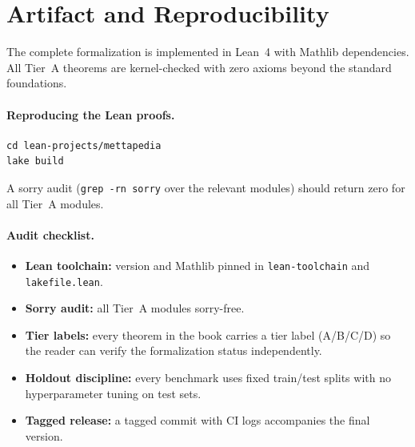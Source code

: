 \section{Artifact and Reproducibility}
\label{sec:artifact}

The complete formalization is implemented in Lean~4 with Mathlib
dependencies.  All Tier~A theorems are kernel-checked with zero axioms
beyond the standard foundations.

\paragraph{Reproducing the Lean proofs.}

\begin{lstlisting}
cd lean-projects/mettapedia
lake build
\end{lstlisting}

\noindent
A sorry audit (\texttt{grep -rn sorry} over the relevant modules)
should return zero for all Tier~A modules.

\paragraph{Audit checklist.}
\begin{itemize}
\item \textbf{Lean toolchain:} version and Mathlib pinned in
  \texttt{lean-toolchain} and \texttt{lakefile.lean}.
\item \textbf{Sorry audit:} all Tier~A modules sorry-free.
\item \textbf{Tier labels:} every theorem in the book carries a tier
  label (A/B/C/D) so the reader can verify the formalization status
  independently.
\item \textbf{Holdout discipline:} every benchmark uses fixed
  train/test splits with no hyperparameter tuning on test sets.
\item \textbf{Tagged release:} a tagged commit with CI logs
  accompanies the final version.
\end{itemize}

